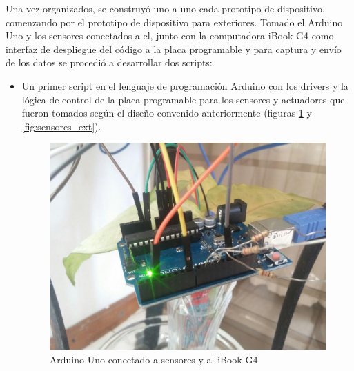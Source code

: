 Una vez organizados, se construyó uno a uno cada prototipo de dispositivo, comenzando por el prototipo de dispositivo para exteriores. Tomado el Arduino Uno y los sensores conectados a el, junto con la computadora iBook G4 como interfaz de despliegue del código a la placa programable y para captura y envío de los datos se procedió a desarrollar dos scripts:
\begin{itemize}
\item Un primer script en el lenguaje de programación Arduino con los drivers y la lógica de control de la placa programable  para los sensores y actuadores que fueron tomados según el diseño convenido anteriormente (figuras \ref{fig:arduino_ext} y \ref{fig:sensores_ext}).
\begin{figure}[!htb]
\centering
\includegraphics[scale=0.18]{./Figuras/arduino_ext.jpg}
\caption{Arduino Uno conectado a sensores y al iBook G4}
\label{fig:arduino_ext}
\end{figure}


\end{itemize}
